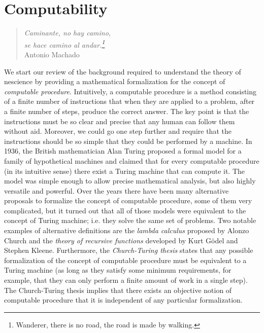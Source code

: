 %
%


\chapter{Computability}
\label{chap:Computability}

\begin{quote}
\begin{flushright}
\emph{Caminante, no hay camino,\\
se hace camino al andar.\footnote{Wanderer, there is no road, the road is made by walking.}}\\
Antonio Machado
\end{flushright}
\end{quote}
\bigskip

We start our review of the background required to understand the theory of nescience by providing a mathematical formalization for the concept of \emph{computable procedure}. Intuitively, a computable procedure is a method consisting of a finite number of instructions that when they are applied to a problem, after a finite number of steps, produce the correct answer. The key point is that the instructions must be so clear and precise that any human can follow them without aid. Moreover, we could go one step further and require that the instructions should be so simple that they could be performed by a machine. In 1936, the British mathematician Alan Turing proposed a formal model for a family of hypothetical machines and claimed that for every computable procedure (in its intuitive sense) there exist a Turing machine that can compute it. The model was simple enough to allow precise mathematical analysis, but also highly versatile and powerful. Over the years there have been many alternative proposals to formalize the concept of computable procedure, some of them very complicated, but it turned out that all of those models were equivalent to the concept of Turing machine; i.e. they solve the same set of problems. Two notable examples of alternative definitions are the \emph{lambda calculus} proposed by Alonzo Church and the \emph{theory of recursive functions} developed by Kurt Gödel and Stephen Kleene. Furthermore, the \emph{Church-Turing thesis} states that any possible formalization of the concept of computable procedure must be equivalent to a Turing machine (as long as they satisfy some minimum requirements, for example, that they can only perform a finite amount of work in a single step). The Church-Turing thesis implies that there exists an objective notion of computable procedure that it is independent of any particular formalization.

